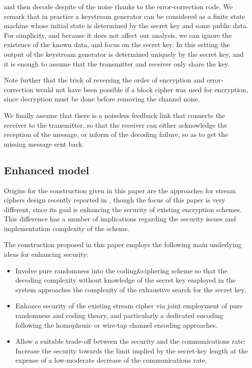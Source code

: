 \documentclass{article}[11pt]
\begin{document}
and then decode  despite of the noise thanks to the error-correction code.
We remark that in practice a keystream generator can be considered as a finite
state machine whose initial state is determined by the secret key and some public
data. For simplicity, and because it does not affect our analysis, we can ignore
the existence of the known data, and focus on the secret key. In this setting the
output of the keystream generator is determined uniquely by the secret key, and
it is enough to assume that the transmitter and receiver only share the key.

Note further that the trick of reversing the order of encryption and error-correction
would not have been possible if a block cipher was used for encryption, since decryption
must be done before removing the channel noise.

We finally assume that there is a noiseless feedback link that connects the
receiver to the transmitter, so that the receiver can either acknowledge the
reception of the message, or inform of the decoding failure, so as to get
the missing message sent back.


\subsection{Enhanced model}

Origins for the construction given in this paper are the
approaches for stream ciphers design recently reported in
\cite{mihaljevic-Computimg2009,mihaljevic-IOSpress2009}, though
the focus of this paper is very different, since its goal is
enhancing the security of existing encryption schemes.
This difference has a number of implications regarding the
security issues and implementation complexity of the scheme.

The construction proposed in this paper employs the following main
underlying ideas for enhancing security:

\begin{itemize}

\item Involve pure randomness into the coding\&ciphering scheme
so that the decoding complexity without knowledge of the secret
key employed in the system approaches the complexity of the
exhaustive search for the secret key.

\item  Enhance security of the existing stream cipher via joint
employment of pure randomness and coding theory, and particularly
a dedicated encoding following the homophonic or wire-tap channel
encoding approaches.

\item Allow a suitable trade-off between the security and the
communications rate: Increase the security towards the limit
implied by the secret-key length at the expense of a low-moderate
decrease of the communications rate.

\end{itemize}
\end{document}
